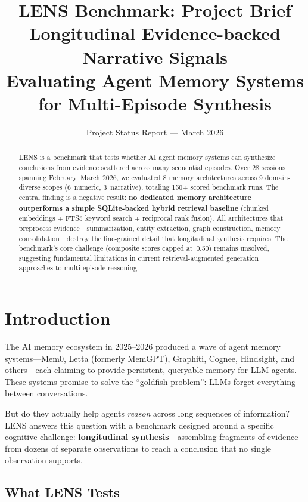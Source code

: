 \documentclass[11pt,letterpaper]{article}
\title{\textbf{LENS Benchmark: Project Brief}\\[0.3em]
\large Longitudinal Evidence-backed Narrative Signals\\[0.2em]
\normalsize Evaluating Agent Memory Systems for Multi-Episode Synthesis}
\author{Project Status Report --- March 2026}
\date{}
\begin{document}
\maketitle
\thispagestyle{empty}

\begin{abstract}
\noindent
LENS is a benchmark that tests whether AI agent memory systems can synthesize conclusions from evidence scattered across many sequential episodes. Over 28 sessions spanning February--March 2026, we evaluated 8 memory architectures across 9 domain-diverse scopes (6~numeric, 3~narrative), totaling 150+ scored benchmark runs. The central finding is a negative result: \textbf{no dedicated memory architecture outperforms a simple SQLite-backed hybrid retrieval baseline} (chunked embeddings + FTS5 keyword search + reciprocal rank fusion). All architectures that preprocess evidence---summarization, entity extraction, graph construction, memory consolidation---destroy the fine-grained detail that longitudinal synthesis requires. The benchmark's core challenge (composite scores capped at~0.50) remains unsolved, suggesting fundamental limitations in current retrieval-augmented generation approaches to multi-episode reasoning.
\end{abstract}

\tableofcontents
\newpage

\section{Introduction}

The AI memory ecosystem in 2025--2026 produced a wave of agent memory systems---Mem0, Letta (formerly MemGPT), Graphiti, Cognee, Hindsight, and others---each claiming to provide persistent, queryable memory for LLM agents. These systems promise to solve the ``goldfish problem'': LLMs forget everything between conversations.

But do they actually help agents \emph{reason} across long sequences of information? LENS answers this question with a benchmark designed around a specific cognitive challenge: \textbf{longitudinal synthesis}---assembling fragments of evidence from dozens of separate observations to reach a conclusion that no single observation supports.

\subsection{What LENS Tests}
\end{document}

